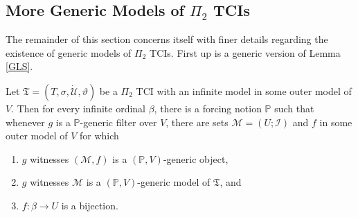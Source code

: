 \documentclass[12pt]{article}
\numberwithin{equation}{section}
\begin{document}
\subsection{More Generic Models of \texorpdfstring{$\Pi_2$}{} TCIs}

The remainder of this section concerns itself with finer details regarding the existence of generic models of $\Pi_2$ TCIs. First up is a generic version of Lemma \ref{GLS}.

\begin{lem}\label{genericls}
Let $\mathfrak{T} = (T, \sigma, \dot{\mathcal{U}}, \vartheta)$ be a $\Pi_2$ TCI with an infinite model in some outer model of $V$. Then for every infinite ordinal $\beta$, there is a forcing notion $\mathbb{P}$ such that whenever $g$ is a $\mathbb{P}$-generic filter over $V$, there are sets $\mathcal{M} = (U; \mathcal{I})$ and $f$ in some outer model of $V$ for which  
\begin{enumerate}[label=(\alph*)]
    \item\label{ggls0} $g$ witnesses $(\mathcal{M}, f)$ is a $(\mathbb{P}, V)$-generic object, 
    \item\label{gglsa} $g$ witnesses $\mathcal{M}$ is a $(\mathbb{P}, V)$-generic model of $\mathfrak{T}$, and
    \item\label{gglsb} $f : \beta \longrightarrow U$ is a bijection.
\end{enumerate}
\end{lem}
\end{document}
